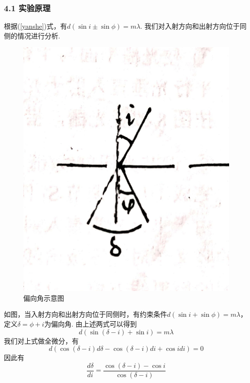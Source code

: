\documentclass[UTF8]{ctexart}
\begin{document}
\subsubsection*{4.1 实验原理}
根据(\ref{yanshe})式，有$d(\sin i\pm\sin \phi)=m\lambda$. 我们对入射方向和出射方向位于同侧的情况进行分析.\par
\begin{figure}[H]\begin{center}
    \includegraphics[scale=0.15]{5.jpg}
    \caption{偏向角示意图}
\end{center}\end{figure}
如图，当入射方向和出射方向位于同侧时，有约束条件$d(\sin i+\sin \phi)=m\lambda$，定义$\delta=\phi+i$为偏向角. 由上述两式可以得到
\begin{equation}
    d(\sin(\delta-i)+\sin i)=m\lambda
\end{equation}
我们对上式做全微分，有
\begin{equation}
    d(\cos(\delta-i)d\delta-\cos(\delta-i)di+\cos idi)=0
\end{equation}
因此有
\begin{equation}
    \label{yijiedao}
    \frac{d\delta}{di}=\frac{\cos(\delta-i)-\cos i}{\cos(\delta-i)}
\end{equation}
\end{document}
